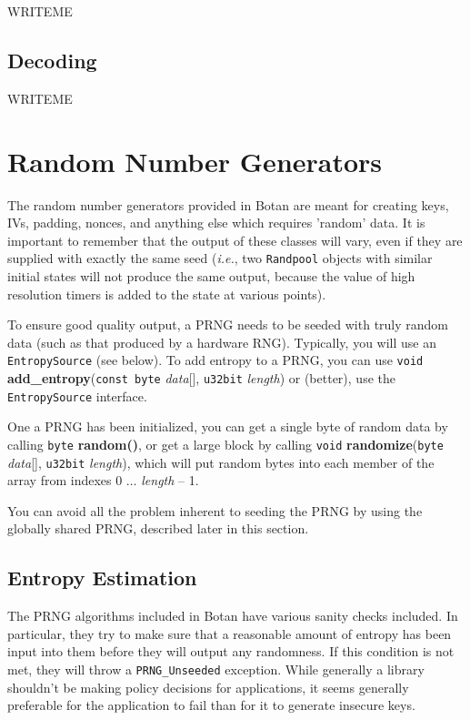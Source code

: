 \documentclass{article}
\newcommand{\function}[1]{\textbf{#1}}
\newcommand{\type}[1]{\texttt{#1}}
\renewcommand{\arg}[1]{\textsl{#1}}
\newcommand{\ie}[0]{\emph{i.e.}}
\begin{document}
WRITEME

\subsection{Decoding}

WRITEME

\pagebreak

\section{Random Number Generators}

The random number generators provided in Botan are meant for creating keys,
IVs, padding, nonces, and anything else which requires 'random' data. It is
important to remember that the output of these classes will vary, even if they
are supplied with exactly the same seed (\ie, two \type{Randpool} objects with
similar initial states will not produce the same output, because the value of
high resolution timers is added to the state at various points).

To ensure good quality output, a PRNG needs to be seeded with truly random data
(such as that produced by a hardware RNG). Typically, you will use an
\type{EntropySource} (see below). To add entropy to a PRNG, you can use
\type{void} \function{add\_entropy}(\type{const byte} \arg{data}[],
\type{u32bit} \arg{length}) or (better), use the \type{EntropySource}
interface.

One a PRNG has been initialized, you can get a single byte of random data by
calling \type{byte} \function{random()}, or get a large block by calling
\type{void} \function{randomize}(\type{byte} \arg{data}[], \type{u32bit}
\arg{length}), which will put random bytes into each member of the array from
indexes 0 $\ldots$ \arg{length} -- 1.

You can avoid all the problem inherent to seeding the PRNG by using the
globally shared PRNG, described later in this section.

\subsection{Entropy Estimation}

The PRNG algorithms included in Botan have various sanity checks included. In
particular, they try to make sure that a reasonable amount of entropy has been
input into them before they will output any randomness. If this condition is
not met, they will throw a \type{PRNG\_Unseeded} exception. While generally a
library shouldn't be making policy decisions for applications, it seems
generally preferable for the application to fail than for it to generate
insecure keys.
\end{document}
